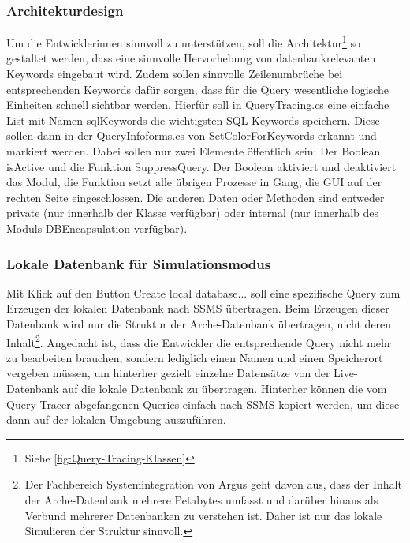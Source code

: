 \documentclass[11pt,toc=sectionentrywithoutdots, 
headheight=44pt, headings=optiontoheadandtoc, hyperfootnotes=false, hypertexnames=false]{scrartcl}
\newcommand\extendedref[1]{Siehe \ref{#1}}
\begin{document}
\subsubsection{Architekturdesign}
Um die Entwicklerinnen sinnvoll zu unterstützen, soll die Architektur\footnote{\extendedref{fig:Query-Tracing-Klassen}} so gestaltet werden, dass eine sinnvolle Hervorhebung von datenbankrelevanten Keywords eingebaut wird. Zudem sollen sinnvolle Zeilenumbrüche bei entsprechenden Keywords dafür sorgen, dass für die Query wesentliche logische Einheiten schnell sichtbar werden. Hierfür soll in QueryTracing.cs eine einfache \gls{List} mit Namen \glqq sqlKeywords \grqq{} die wichtigsten SQL Keywords speichern. Diese sollen dann in der \glqq QueryInfoforms.cs\grqq{} von \glqq SetColorForKeywords\grqq{} erkannt und markiert werden. Dabei sollen nur zwei Elemente öffentlich sein: Der Boolean \glqq isActive\grqq{} und die Funktion \glqq SuppressQuery\grqq{}. Der Boolean aktiviert und deaktiviert das Modul, die Funktion setzt alle übrigen Prozesse in Gang, die GUI auf der rechten Seite eingeschlossen. Die anderen Daten oder Methoden sind entweder \glqq private\grqq{} (nur innerhalb der Klasse verfügbar) oder \glqq internal\grqq{} (nur innerhalb des Moduls DBEncapsulation verfügbar).

\subsubsection{Lokale Datenbank für Simulationsmodus}
Mit Klick auf den Button \glqq Create local database...\grqq{} soll eine spezifische Query zum Erzeugen der lokalen Datenbank nach SSMS übertragen. Beim Erzeugen dieser Datenbank wird nur die Struktur der Arche-Datenbank übertragen, nicht deren Inhalt\footnote{Der Fachbereich Systemintegration von Argus geht davon aus, dass der Inhalt der Arche-Datenbank mehrere Petabytes umfasst und darüber hinaus als Verbund mehrerer Datenbanken zu verstehen ist. Daher ist nur das lokale Simulieren der Struktur sinnvoll.}. Angedacht ist, dass die Entwickler die entsprechende Query nicht mehr zu bearbeiten brauchen, sondern lediglich einen Namen und einen Speicherort vergeben müssen, um hinterher gezielt einzelne Datensätze von der Live-Datenbank auf die lokale Datenbank zu übertragen. Hinterher können die vom Query-Tracer abgefangenen Queries einfach nach SSMS kopiert werden, um diese dann auf der lokalen Umgebung auszuführen. 
\end{document}
